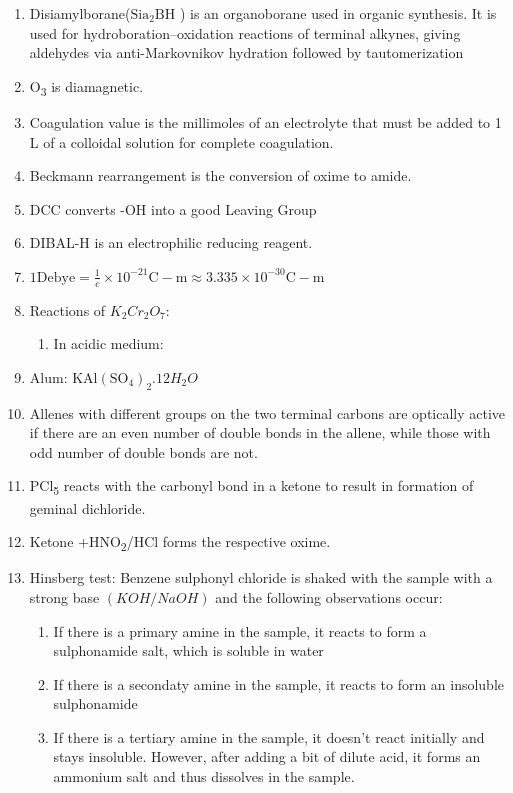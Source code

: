 \documentclass{article}
\numberwithin{equation}{section}
\numberwithin{figure}{section}
\newcommand{\Sub}[1]{\textsubscript{#1}}
\begin{document}
\begin{enumerate}
\begin{enumerate}
		\end{enumerate}
	\item Disiamylborane($\mathrm{Sia_2BH}$ ) is an organoborane used in organic synthesis. It is used for hydroboration–oxidation reactions of terminal alkynes, giving aldehydes via anti-Markovnikov hydration followed by tautomerization
	\item O\Sub{3} is diamagnetic.
	\item Coagulation value is the millimoles of an electrolyte that must be added to 1 L of a colloidal solution for complete coagulation. 
	\item Beckmann rearrangement is the conversion of oxime to amide.
	\item DCC converts -OH into a good Leaving Group
	\item DIBAL-H is an electrophilic reducing reagent.
	\item $1 \mathrm{Debye}= \frac{1}{c}\times 10^{-21} \mathrm{C-m}\approx 3.335 \times 10^{-30}\mathrm{C-m}$
	\item Reactions of $K_2 Cr_2 O_7$:
		\begin{enumerate}
			\item In acidic medium: 
		\end{enumerate}
	\item Alum: $\mathrm{KAl(SO_4)_2}.12H_{2} O$
	\item Allenes with different groups on the two terminal carbons are optically active if there are an even number of double bonds in the allene, while those with odd number of double bonds are not.
	\item PCl\Sub{5} reacts with the carbonyl bond in a ketone to result in formation of geminal dichloride.
	\item Ketone +HNO\Sub{2}/HCl forms the respective oxime.
	\item Hinsberg test:
		Benzene sulphonyl chloride is shaked with the sample with a strong base $(KOH/NaOH)$ and the following observations occur:
		\begin{enumerate}
			\item If there is a primary amine in the sample, it reacts to form a sulphonamide salt, which is soluble in water
			\item If there is a secondaty amine in the sample, it reacts to form an insoluble sulphonamide
			\item If there is a tertiary amine in the sample, it doesn't react initially and stays insoluble. However, after adding a bit of dilute acid, it forms an ammonium salt and thus dissolves in the sample. 

\end{enumerate}
\end{enumerate}
\end{document}
